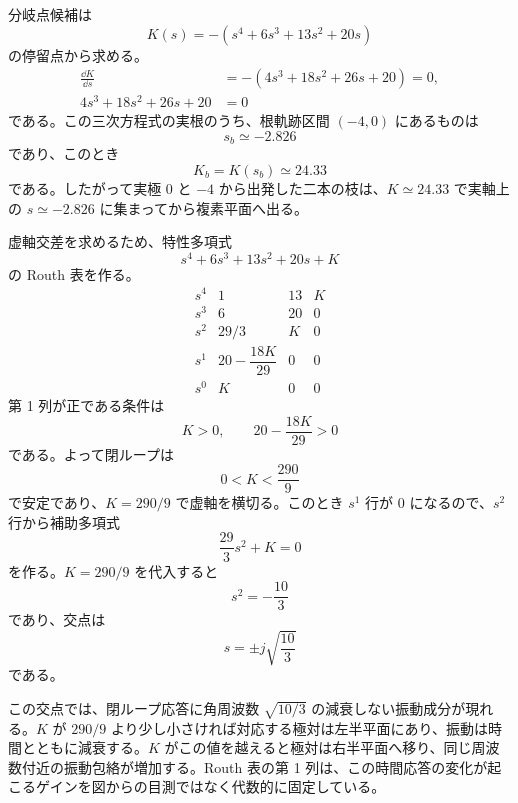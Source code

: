 \begin{example}[複素極を含む四次系の根軌跡]
分岐点候補は
\begin{equation}
  K(s)=-(s^4+6s^3+13s^2+20s)
\end{equation}
の停留点から求める。
\begin{align}
  \frac{\dd K}{\dd s}
  &=-(4s^3+18s^2+26s+20)=0,\\
  4s^3+18s^2+26s+20&=0
\end{align}
である。この三次方程式の実根のうち、根軌跡区間 $(-4,0)$ にあるものは
\begin{equation}
  s_b\simeq -2.826
\end{equation}
であり、このとき
\begin{equation}
  K_b=K(s_b)\simeq 24.33
\end{equation}
である。したがって実極 $0$ と $-4$ から出発した二本の枝は、$K\simeq24.33$ で実軸上の $s\simeq-2.826$ に集まってから複素平面へ出る。

虚軸交差を求めるため、特性多項式
\begin{equation}
  s^4+6s^3+13s^2+20s+K
\end{equation}
の Routh 表を作る。
\begin{equation}
\begin{array}{c|ccc}
s^4 & 1 & 13 & K\\
s^3 & 6 & 20 & 0\\
s^2 & 29/3 & K & 0\\
s^1 & 20-\dfrac{18K}{29} & 0 & 0\\
s^0 & K & 0 & 0
\end{array}
\end{equation}
第 1 列が正である条件は
\begin{equation}
  K>0,\qquad 20-\frac{18K}{29}>0
\end{equation}
である。よって閉ループは
\begin{equation}
  0<K<\frac{290}{9}
\end{equation}
で安定であり、$K=290/9$ で虚軸を横切る。このとき $s^1$ 行が 0 になるので、$s^2$ 行から補助多項式
\begin{equation}
  \frac{29}{3}s^2+K=0
\end{equation}
を作る。$K=290/9$ を代入すると
\begin{equation}
  s^2=-\frac{10}{3}
\end{equation}
であり、交点は
\begin{equation}
  s=\pm j\sqrt{\frac{10}{3}}
\end{equation}
である。

この交点では、閉ループ応答に角周波数 $\sqrt{10/3}$ の減衰しない振動成分が現れる。$K$ が $290/9$ より少し小さければ対応する極対は左半平面にあり、振動は時間とともに減衰する。$K$ がこの値を越えると極対は右半平面へ移り、同じ周波数付近の振動包絡が増加する。Routh 表の第 1 列は、この時間応答の変化が起こるゲインを図からの目測ではなく代数的に固定している。


\end{example}
